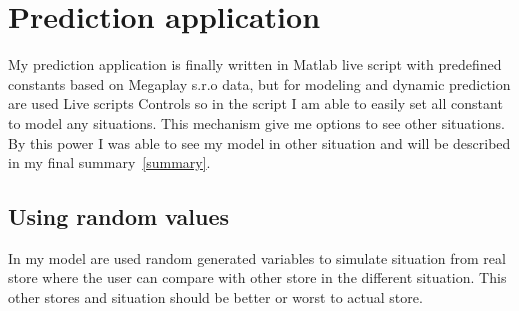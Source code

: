 \section{Prediction application} \label{sec:app}
My prediction application is finally written in Matlab live script with predefined constants based on Megaplay s.r.o data,
but for modeling and dynamic prediction are used Live scripts Controls so in the script I am able to easily set all constant to model any situations.
This mechanism give me options to see other situations.
By this power I was able to see my model in other situation and will be described in my final summary~\ref{summary}.\\
\subsection{Using random values} \label{subsec:rand}
In my model are used random generated variables to simulate situation from real store where the user can compare with other store in
the different situation.
This other stores and situation should be better or worst to actual store.
